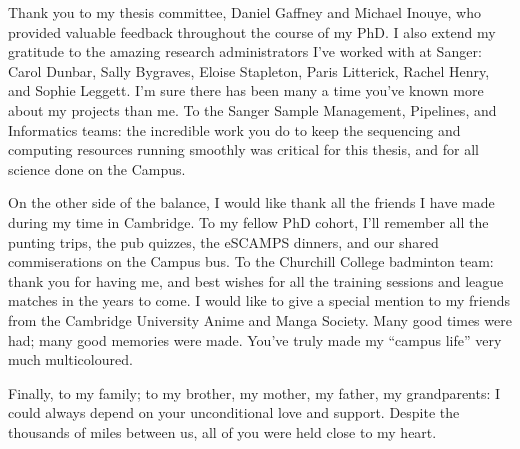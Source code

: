Thank you to my thesis committee, Daniel Gaffney and Michael Inouye, who provided valuable feedback throughout the course of my PhD.
I also extend my gratitude to the amazing research administrators I've worked with at Sanger: Carol Dunbar, Sally Bygraves, Eloise Stapleton, Paris Litterick, Rachel Henry, and Sophie Leggett.
I'm sure there has been many a time you've known more about my projects than me. 
To the Sanger Sample Management, Pipelines, and Informatics teams:
the incredible work you do to keep the sequencing and computing resources running smoothly was critical for this thesis, and for all science done on the Campus.

On the other side of the balance, I would like thank all the friends I have made during my time in Cambridge.
To my fellow PhD cohort, 
I'll remember all the punting trips, the pub quizzes, the eSCAMPS dinners,
and our shared commiserations on the Campus bus.
To the Churchill College badminton team: 
thank you for having me, and best wishes for all the training sessions and league matches in the years to come.
I would like to give a special mention to my friends from the Cambridge University Anime and Manga Society.
Many good times were had; many good memories were made.
You've truly made my \enquote{campus life} very much multicoloured.

Finally, to my family; to my brother, my mother, my father, my grandparents:
I could always depend on your unconditional love and support.
Despite the thousands of miles between us, 
all of you were held close to my heart.
%

